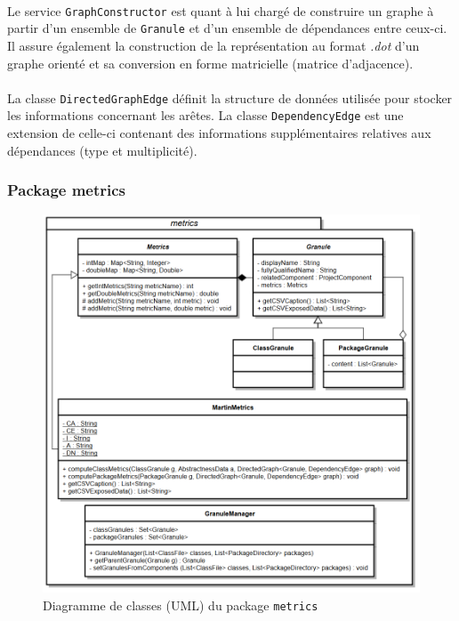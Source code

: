 \documentclass{scrartcl}
\begin{document}
    \paragraph{}Le service \texttt{GraphConstructor} est quant à lui chargé de construire un graphe à partir d’un ensemble de \texttt{Granule} et d’un ensemble de dépendances entre ceux-ci. Il assure également la construction de la représentation au format \emph{.dot} d'un graphe orienté et sa conversion en forme matricielle (matrice d'adjacence).
    
    \paragraph{}La classe \texttt{DirectedGraphEdge} définit la structure de données utilisée pour stocker les informations concernant les arêtes. La classe \texttt{DependencyEdge} est une extension de celle-ci contenant des informations supplémentaires relatives aux dépendances (type et multiplicité).

\subsubsection{Package metrics}

    \begin{figure}[h!]
        \centering
        \includegraphics[width=\textwidth]{img/uml/metrics.png}
        \caption{Diagramme de classes (UML) du package \texttt{metrics}}
    \end{figure}
\end{document}
